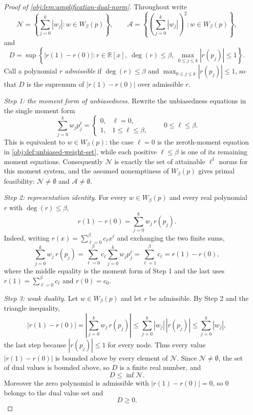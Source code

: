 \begin{proof}[Proof of \cref{obj:lem:amplification-dual-norm}]
Throughout write
\[
\mathcal N=\left\{\sum_{j=0}^k |w_j|:w\in W_\beta(p)\right\},
\qquad
\mathcal A=\left\{\left(\sum_{j=0}^k |w_j|\right)^2:w\in W_\beta(p)\right\},
\]
and
\[
D=
\sup\left\{
|r(1)-r(0)|:
r\in\mathbb R[x],\ \deg(r)\le\beta,\ \max_{0\le j\le k}|r(p_j)|\le1
\right\}.
\]
Call a polynomial \(r\) \emph{admissible} if \(\deg(r)\le\beta\) and \(\max_{0\le j\le k}|r(p_j)|\le1\), so that \(D\) is the supremum of \(|r(1)-r(0)|\) over admissible \(r\).

\emph{Step 1: the moment form of unbiasedness.}
Rewrite the unbiasedness equations in the single moment form
\[
\sum_{j=0}^k w_jp_j^\ell=
\begin{cases}
0,&\ell=0,\\
1,&1\le \ell\le\beta,
\end{cases}
\qquad 0\le\ell\le\beta .
\]
This is equivalent to \(w\in W_\beta(p)\): the case \(\ell=0\) is the zeroth-moment equation in \cref{obj:def:unbiased-weight-set}, while each positive \(\ell\le\beta\) is one of its remaining moment equations. %
Consequently \(\mathcal N\) is exactly the set of attainable \(\ell^1\) norms for this moment system, and the assumed nonemptiness of \(W_\beta(p)\) gives primal feasibility: \(\mathcal N\ne\emptyset\) and \(\mathcal A\ne\emptyset\). %

\emph{Step 2: representation identity.}
For every \(w\in W_\beta(p)\) and every real polynomial \(r\) with \(\deg(r)\le\beta\),
\[
r(1)-r(0)=\sum_{j=0}^k w_j\,r(p_j).
\]
Indeed, writing \(r(x)=\sum_{\ell=0}^{\beta}c_\ell x^\ell\) and exchanging the two finite sums,
\[
\sum_{j=0}^k w_j\,r(p_j)
=
\sum_{\ell=0}^{\beta}c_\ell\sum_{j=0}^k w_jp_j^\ell
=
\sum_{\ell=1}^{\beta}c_\ell
=
r(1)-r(0),
\]
where the middle equality is the moment form of Step 1 and the last uses \(r(1)=\sum_{\ell=0}^{\beta}c_\ell\) and \(r(0)=c_0\). %

\emph{Step 3: weak duality.}
Let \(w\in W_\beta(p)\) and let \(r\) be admissible. By Step 2 and the triangle inequality,
\[
|r(1)-r(0)|
=
\left|\sum_{j=0}^k w_j\,r(p_j)\right|
\le
\sum_{j=0}^k |w_j|\,|r(p_j)|
\le
\sum_{j=0}^k |w_j| ,
\]
the last step because \(|r(p_j)|\le1\) for every node. %
Thus every value \(|r(1)-r(0)|\) is bounded above by every element of \(\mathcal N\). Since \(\mathcal N\ne\emptyset\), the set of dual values is bounded above, so \(D\) is a finite real number, and
\[
D\le \inf\mathcal N .
\] %
Moreover the zero polynomial is admissible with \(|r(1)-r(0)|=0\), so \(0\) belongs to the dual value set and
\[
D\ge 0 .
\] %


\end{proof}
